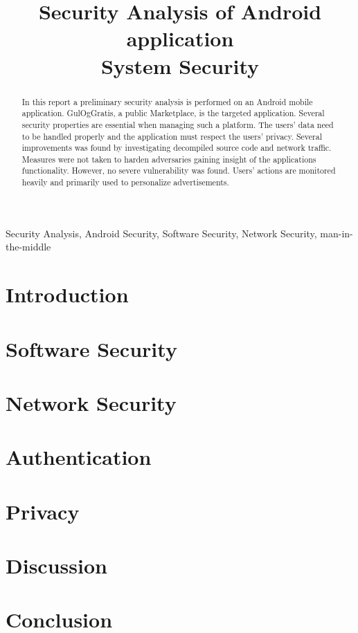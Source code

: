 \documentclass[conference]{IEEEtran}
\begin{document}
\title{Security Analysis of Android application\\
{\LARGE System Security}}

\author{
}

\maketitle

\begin{abstract}
In this report a preliminary security analysis is performed on an Android mobile application. GulOgGratis, a public Marketplace, is the targeted application. Several security properties are essential when managing such a platform. The users' data need to be handled properly and the application must respect the users' privacy. Several improvements was found by investigating decompiled source code and network traffic. Measures were not taken to harden adversaries gaining insight of the applications functionality. However, no severe vulnerability was found. Users' actions are monitored heavily and primarily used to personalize advertisements.
\end{abstract}

\begin{IEEEkeywords}
Security Analysis, Android Security, Software Security, Network Security, man-in-the-middle
\end{IEEEkeywords}

\section{Introduction}


\section{Software Security}


\section{Network Security}


\section{Authentication}


\section{Privacy}


\section{Discussion}


\section{Conclusion}


\printbibliography
\end{document}
